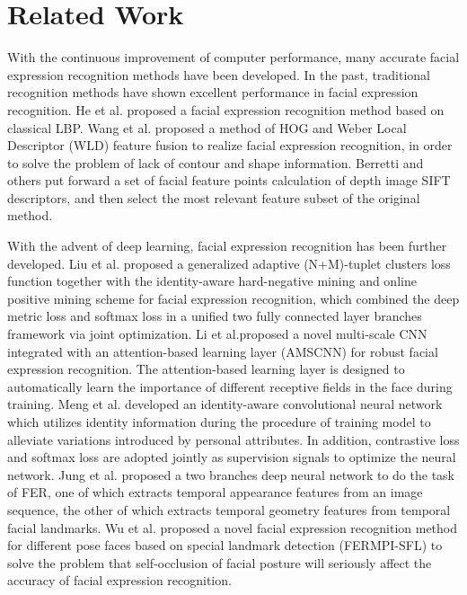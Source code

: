 \documentclass[10pt, conference, compsocconf]{IEEEtran}
\begin{document}
\section{Related Work}

With the continuous improvement of computer performance, many accurate facial expression recognition methods have been developed. In the past, traditional recognition methods have shown excellent performance in facial expression recognition. He\cite{He2005An} et al. proposed a facial expression recognition method based on classical LBP. Wang\cite{Wang2014Feature} et al. proposed a method of HOG and Weber Local Descriptor (WLD) feature fusion to realize facial expression recognition, in order to solve the problem of lack of contour and shape information. Berretti\cite{Berretti2010A} and others put forward a set of facial feature points calculation of depth image SIFT descriptors, and then select the most relevant feature subset of the original method.

With the advent of deep learning, facial expression recognition has been further developed. Liu\cite{Liu2017Adaptive} et al. proposed a generalized adaptive (N+M)-tuplet clusters loss function together with the identity-aware hard-negative mining and online positive mining scheme for facial expression recognition, which combined the deep metric loss and softmax loss in a unified two fully connected layer branches framework via joint optimization. Li\cite{li2018facial} et al.proposed a novel multi-scale CNN integrated with an attention-based learning layer (AMSCNN) for robust facial expression recognition. The attention-based learning layer is designed to automatically learn the importance of different receptive fields in the face during training. Meng\cite{Meng2017Identity} et al. developed an identity-aware convolutional neural network which utilizes identity information during the procedure of training model to alleviate variations introduced by personal attributes. In addition, contrastive loss and softmax loss are adopted jointly as supervision signals to optimize the neural network. Jung\cite{Jung2015Joint} et al. proposed a two branches deep neural network to do the task of FER, one of which extracts temporal appearance features from an image sequence, the other of which extracts temporal geometry features from temporal facial landmarks. Wu\cite{wu2018facial} et al. proposed a novel facial expression recognition method for different pose faces based on special landmark detection (FERMPI-SFL) to solve the problem that self-occlusion of facial posture will seriously affect the accuracy of facial expression recognition.
\end{document}

